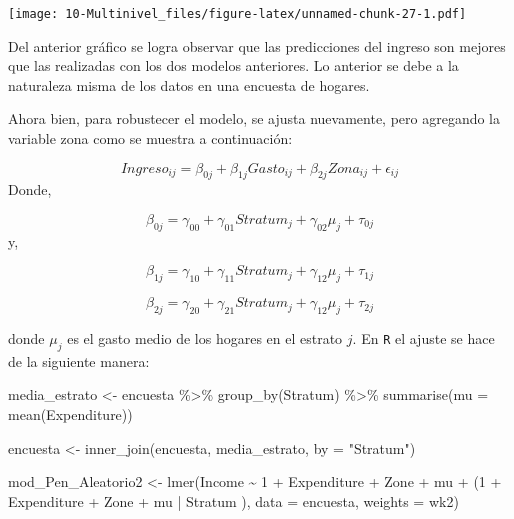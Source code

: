 \documentclass[
  12pt,
]{book}
\newenvironment{Shaded}{\begin{snugshade}}{\end{snugshade}}
\newcommand{\AttributeTok}[1]{\textcolor[rgb]{0.77,0.63,0.00}{#1}}
\newcommand{\DecValTok}[1]{\textcolor[rgb]{0.00,0.00,0.81}{#1}}
\newcommand{\FunctionTok}[1]{\textcolor[rgb]{0.00,0.00,0.00}{#1}}
\newcommand{\NormalTok}[1]{#1}
\newcommand{\OtherTok}[1]{\textcolor[rgb]{0.56,0.35,0.01}{#1}}
\newcommand{\SpecialCharTok}[1]{\textcolor[rgb]{0.00,0.00,0.00}{#1}}
\newcommand{\StringTok}[1]{\textcolor[rgb]{0.31,0.60,0.02}{#1}}
\begin{document}
\texttt{[image: 10-Multinivel\_files/figure-latex/unnamed-chunk-27-1.pdf]}

Del anterior gráfico se logra observar que las predicciones del ingreso son mejores que las realizadas con los dos modelos anteriores. Lo anterior se debe a la naturaleza misma de los datos en una encuesta de hogares.

Ahora bien, para robustecer el modelo, se ajusta nuevamente, pero agregando la variable zona como se muestra a continuación:

\[
Ingreso_{ij}=\beta_{0j}+\beta_{1j}Gasto_{ij}+\beta_{2j}Zona_{ij} +\epsilon_{ij}
\]
Donde,

\[
\beta_{0j} = \gamma_{00}+\gamma_{01}Stratum_{j} + \gamma_{02}\mu_{j}  + \tau_{0j}
\]
y,

\[
\beta_{1j} = \gamma_{10}+\gamma_{11}Stratum_{j} + \gamma_{12}\mu_{j} + \tau_{1j}
\]

\[
\beta_{2j} = \gamma_{20}+\gamma_{21}Stratum_{j} + \gamma_{12}\mu_{j} + \tau_{2j}
\]

donde \(\mu_{j}\) es el gasto medio de los hogares en el estrato \(j\). En \texttt{R} el ajuste se hace de la siguiente manera:

\begin{Shaded}
\begin{Highlighting}[]
\NormalTok{media\_estrato }\OtherTok{\textless{}{-}}\NormalTok{ encuesta }\SpecialCharTok{\%\textgreater{}\%} \FunctionTok{group\_by}\NormalTok{(Stratum) }\SpecialCharTok{\%\textgreater{}\%} 
  \FunctionTok{summarise}\NormalTok{(}\AttributeTok{mu =} \FunctionTok{mean}\NormalTok{(Expenditure))}

\NormalTok{encuesta }\OtherTok{\textless{}{-}} \FunctionTok{inner\_join}\NormalTok{(encuesta, media\_estrato, }\AttributeTok{by =} \StringTok{"Stratum"}\NormalTok{)  }

\NormalTok{mod\_Pen\_Aleatorio2 }\OtherTok{\textless{}{-}} \FunctionTok{lmer}\NormalTok{(Income }\SpecialCharTok{\textasciitilde{}} \DecValTok{1} \SpecialCharTok{+}\NormalTok{ Expenditure }\SpecialCharTok{+}\NormalTok{ Zone }\SpecialCharTok{+}\NormalTok{ mu }\SpecialCharTok{+} 
\NormalTok{    (}\DecValTok{1} \SpecialCharTok{+}\NormalTok{ Expenditure }\SpecialCharTok{+}\NormalTok{ Zone }\SpecialCharTok{+}\NormalTok{ mu }\SpecialCharTok{|}\NormalTok{ Stratum ),}
    \AttributeTok{data =}\NormalTok{ encuesta, }\AttributeTok{weights  =}\NormalTok{  wk2)}
\end{Highlighting}
\end{Shaded}
\end{document}
